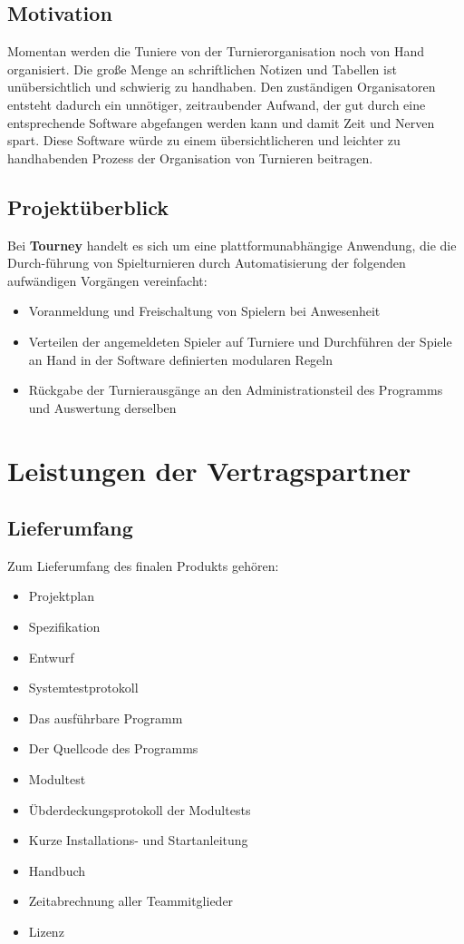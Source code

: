 \documentclass[11pt]{article}
\begin{document}
\subsection{Motivation}

Momentan werden die Tuniere von der Turnierorganisation noch von Hand organisiert. Die große Menge an schriftlichen Notizen und Tabellen ist unübersichtlich und schwierig zu handhaben. Den zuständigen Organisatoren entsteht dadurch ein unnötiger, zeitraubender Aufwand, der gut durch eine entsprechende Software abgefangen werden kann und damit Zeit und Nerven spart. Diese Software würde zu einem übersichtlicheren und leichter zu handhabenden Prozess der Organisation von Turnieren beitragen.

\subsection{Projektüberblick}

Bei \textbf{Tourney} handelt es sich um eine plattformunabhängige Anwendung, die die Durch-führung von Spielturnieren durch Automatisierung der folgenden aufwändigen Vorgängen vereinfacht:
\begin{itemize}
	\item Voranmeldung und Freischaltung von Spielern bei Anwesenheit
	\item Verteilen der angemeldeten Spieler auf Turniere und Durchführen der Spiele an Hand in der Software definierten modularen Regeln
	\item Rückgabe der Turnierausgänge an den Administrationsteil des Programms und Auswertung derselben
\end{itemize}

\section{Leistungen der Vertragspartner}

\subsection{Lieferumfang}

Zum Lieferumfang des finalen Produkts gehören:

\begin{itemize}
	\item Projektplan
	\item Spezifikation
	\item Entwurf
	\item Systemtestprotokoll
	\item Das ausführbare Programm
	\item Der Quellcode des Programms
	\item Modultest
	\item Übderdeckungsprotokoll der Modultests
	\item Kurze Installations- und Startanleitung
	\item Handbuch
	\item Zeitabrechnung aller Teammitglieder
	\item Lizenz
\end{itemize}
\end{document}
